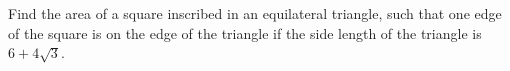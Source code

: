 Find the area of a square inscribed in an equilateral triangle, such that one edge of the square is on the edge of the triangle if the side length of the triangle is $6+4\sqrt{3}$.
